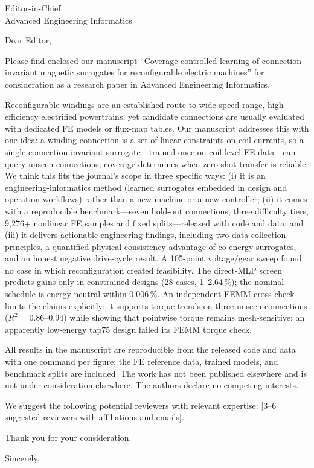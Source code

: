 \documentclass{letter}
\begin{document}
\sloppy

\begin{letter}{Editor-in-Chief\\Advanced Engineering Informatics}

\opening{Dear Editor,}

Please find enclosed our manuscript ``Coverage-controlled learning of
connection-invariant magnetic surrogates for reconfigurable electric
machines'' for consideration as a research paper in Advanced Engineering
Informatics.

Reconfigurable windings are an established route to wide-speed-range,
high-efficiency electrified powertrains, yet candidate connections are
usually evaluated with dedicated FE models or flux-map tables. Our
manuscript addresses this with one idea: a winding
connection is a set of linear constraints on coil currents, so a single
connection-invariant surrogate---trained once on coil-level FE data---can
query unseen connections; coverage determines when zero-shot transfer is
reliable. We think this fits the journal's
scope in three specific ways: (i) it is an engineering-informatics method
(learned surrogates embedded in design and operation workflows) rather than
a new machine or a new controller; (ii) it comes with a reproducible
benchmark---seven hold-out connections, three difficulty tiers, 9{,}276+
nonlinear FE samples and fixed splits---released with code and data; and
(iii) it delivers actionable engineering findings, including two
data-collection principles, a quantified physical-consistency advantage of
co-energy surrogates, and an honest negative drive-cycle result. A
105-point voltage/gear sweep found no case in which reconfiguration
created feasibility. The direct-MLP screen predicts gains only in
constrained designs (28 cases, 1--2.64\,\%); the nominal schedule is
energy-neutral within 0.006\,\%.
An independent FEMM cross-check limits the claims explicitly: it supports
torque trends on three unseen connections ($R^2=0.86$--$0.94$) while
showing that pointwise torque remains mesh-sensitive; an apparently
low-energy tap75 design failed its FEMM torque check.

All results in the manuscript are reproducible from the released code and
data with one command per figure; the FE reference data, trained models, and
benchmark splits are included. The work has not been published elsewhere and
is not under consideration elsewhere. The authors declare no competing
interests.

We suggest the following potential reviewers with relevant expertise:
[3--6 suggested reviewers with affiliations and emails].

Thank you for your consideration.

\closing{Sincerely,}

\end{letter}
\end{document}
